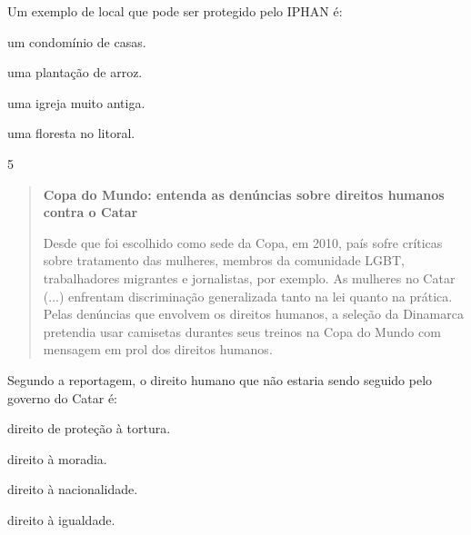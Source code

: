 Um exemplo de local que pode ser protegido pelo IPHAN é:

\begin{escolha}
\item um condomínio de casas.

\item uma plantação de arroz.

\item uma igreja muito antiga.

\item uma floresta no litoral.
\end{escolha}


\num{5}

\begin{quote}
\textbf{Copa do Mundo: entenda as denúncias sobre direitos humanos contra o Catar }

Desde que foi escolhido como sede da Copa, em 2010, país sofre críticas
sobre tratamento das mulheres, membros da comunidade LGBT, trabalhadores
migrantes e jornalistas, por exemplo. As mulheres no Catar (...)
enfrentam discriminação generalizada tanto na lei quanto na prática.
Pelas denúncias que envolvem os direitos humanos, a seleção da Dinamarca
pretendia usar camisetas durantes seus treinos na Copa do Mundo com
mensagem em prol dos direitos humanos.

\end{quote}

Segundo a reportagem, o direito humano que não estaria sendo seguido
pelo governo do Catar é:

\begin{escolha}
\item direito de proteção à tortura.

\item direito à moradia.

\item direito à nacionalidade.

\item direito à igualdade.
\end{escolha}

